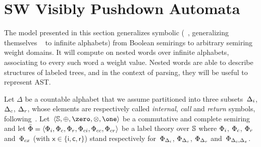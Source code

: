 

\section{SW Visibly Pushdown Automata}
\label{section:SWVPA}\label{sec:SWVPA}
The model presented in this section generalizes symbolic \VPA
(\SVPA~\cite{dAntonyAlur14SVPDA},
 generalizing themselves \VPA~\cite{AlurMadhusudan09nested} to infinite alphabets)
from Boolean semirings to arbitrary semiring weight domains.
It will compute on nested words over infinite alphabets,
associating to every such word a weight value.
Nested words are able to describe structures of labeled trees,
and in the context of parsing, they will be useful to
represent AST. %

\noindent
\label{sec:SWVPA-def}
Let $\Delta$ be a countable alphabet
that we assume partitioned into three
subsets~$\Deltai$, $\Deltac$, $\Deltar$,
whose elements are respectively called
\emph{internal}, \emph{call} and \emph{return} symbols,
following~\cite{AlurMadhusudan09nested}.
Let~$\< \Semiring, \oplus, \zero, \otimes, \one>$ be a commutative and complete semiring and let
$\bar\Phi = \< \Phii, \Phic, \Phir, \Phici, \Phicc, \Phicr>$
be a label theory over $\mathbb{S}$
where $\Phii$, $\Phic$, $\Phir$ and~$\Phicx$ (with $\mathsf{x} \in \{ \mathsf{i}, \mathsf{c}, \mathsf{r}\}$)
stand respectively
for~$\Phi_\Deltai$, $\Phi_\Deltac$, $\Phi_\Deltar$ and~$\Phi_{\Deltac, \Delta_\mathsf{x}}$.
%

